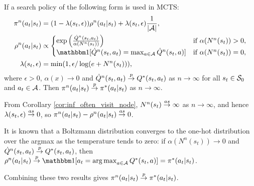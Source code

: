     \begin{lemma}
        \label{lem:q_converge_policy_converge}
        If a search policy of the following form is used in MCTS:
        \begin{align}
            \pi^n(a_t|s_t)&=(1-\lambda(s_t,\epsilon))\rho^n(a_t|s_t) + \lambda(s_t,\epsilon) \frac{1}{|\cl{A}|}, \\
            \rho^n(a_t|s_t) &\propto 
                \begin{cases}
                    \exp\left(\frac{\dot{Q}^n(s_t,a_t)}{\alpha(N^n(s_t))}\right)
                        & \text{if } \alpha(N^n(s_t)) > 0, \\
                    \one[\dot{Q}^n(s_t,a_t) = \max_{a\in\cl{A}} \dot{Q}^n(s_t,a)]
                        & \text{if } \alpha(N^n(s_t)) = 0,
                \end{cases} \\
            \lambda(s_t,\epsilon) &= \min(1,\epsilon/\log(e+N^n(s_t))),
        \end{align}
        where $\epsilon > 0$, $\alpha(x)\rightarrow 0$ and $\dot{Q}^n(s_t,a_t) \overset{p}{\to} Q^*(s_t,a_t)$ as $n\rightarrow\infty$ for all $s_t\in\mathcal{S}_0$ and $a_t\in\mathcal{A}$. Then $\pi^n(a_t|s_t) \overset{p}{\to} \pi^*(a_t|s_t)$ as $n\rightarrow\infty$.
    \end{lemma}
    \begin{proofoutline}
        From Corollary \ref{cor:inf_often_visit_node}, $N^n(s_t)\overset{as}{\to}\infty$ as $n\rightarrow\infty$, and hence $\lambda(s_t,\epsilon)\overset{as}{\to} 0$, so $\pi^n(a_t|s_t) - \rho^n(a_t|s_t) \overset{as}{\to} 0$.

        It is known that a Boltzmann distribution converges to the one-hot distribution over the argmax as the temperature tends to zero: if $\alpha(N^n(s_t))\rightarrow 0$ and $\dot{Q}^n(s_t,a_t)\overset{p}{\to} Q^*(s_t,a_t)$, then $\rho^n(a_t|s_t) \rap \one[a_t = \argmax_{a\in\cl{A}} Q^*(s_t,a)] = \pi^*(a_t|s_t)$.

        Combining these two results gives $\pi^n(a_t|s_t)\overset{p}{\to}\pi^*(a_t|s_t)$.
    \end{proofoutline}




